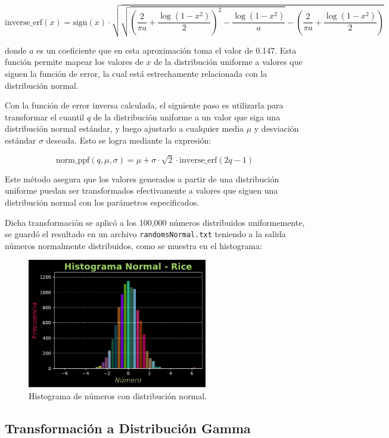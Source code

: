 \documentclass[11pt]{article} %
\begin{document}
	\[
	\text{inverse\_erf}(x) = \text{sign}(x) \cdot \sqrt{\sqrt{\left(\frac{2}{\pi a} + \frac{\log(1 - x^2)}{2}\right)^2 - \frac{\log(1 - x^2)}{a}} - \left(\frac{2}{\pi a} + \frac{\log(1 - x^2)}{2}\right)}
	\]
	
	donde $a$ es un coeficiente que en esta aproximación toma el valor de 0.147. Esta función permite mapear los valores de $x$ de la distribución uniforme a valores que siguen la función de error, la cual está estrechamente relacionada con la distribución normal.
	
	Con la función de error inversa calculada, el siguiente paso es utilizarla para transformar el cuantil $q$ de la distribución uniforme a un valor que siga una distribución normal estándar, y luego ajustarlo a cualquier media $\mu$ y desviación estándar $\sigma$ deseada. Esto se logra mediante la expresión:
	
	\[
	\text{norm\_ppf}(q, \mu, \sigma) = \mu + \sigma \cdot \sqrt{2} \cdot \text{inverse\_erf}(2q - 1)
	\]
	
	Este método asegura que los valores generados a partir de una distribución uniforme puedan ser transformados efectivamente a valores que siguen una distribución normal con los parámetros especificados.
	
	Dicha transformación se aplicó a los 100,000 números distribuidos uniformemente, se guardó el resultado en un archivo \texttt{randomsNormal.txt}  teniendo a la salida números normalmente distribuidos, como se muestra en el histograma:
	
	\begin{figure}[h]
	 	\centering
	 	\includegraphics[width=0.70\textwidth]{../transformaciones/hist_normal_Rice.pdf}
	 	\caption{Histograma de números con distribución normal.}
	 	\label{fig:randomsNormal}
	 \end{figure}
	 
	
	\subsection{Transformación a Distribución Gamma}
	 
\end{document}
